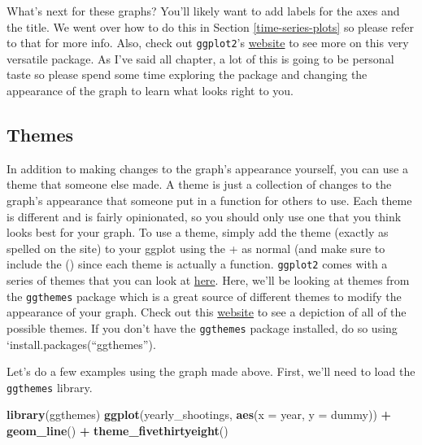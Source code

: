 \documentclass[
  12pt,
]{book}
\newenvironment{Shaded}{\begin{snugshade}}{\end{snugshade}}
\newcommand{\DataTypeTok}[1]{\textcolor[rgb]{0.27,0.27,0.27}{#1}}
\newcommand{\KeywordTok}[1]{\textcolor[rgb]{0.27,0.27,0.27}{\textbf{#1}}}
\newcommand{\NormalTok}[1]{#1}
\newcommand{\OperatorTok}[1]{\textcolor[rgb]{0.43,0.43,0.43}{\textbf{#1}}}
\newcommand{\StringTok}[1]{\textcolor[rgb]{0.5,0.5,0.5}{#1}}
\begin{document}
What's next for these graphs? You'll likely want to add labels for the axes and the title. We went over how to do this in Section \ref{time-series-plots} so please refer to that for more info. Also, check out \texttt{ggplot2}'s \href{https://ggplot2.tidyverse.org/reference/index.html\#section-scales}{website} to see more on this very versatile package. As I've said all chapter, a lot of this is going to be personal taste so please spend some time exploring the package and changing the appearance of the graph to learn what looks right to you.

\hypertarget{themes}{%
\subsection{Themes}\label{themes}}

In addition to making changes to the graph's appearance yourself, you can use a theme that someone else made. A theme is just a collection of changes to the graph's appearance that someone put in a function for others to use. Each theme is different and is fairly opinionated, so you should only use one that you think looks best for your graph. To use a theme, simply add the theme (exactly as spelled on the site) to your ggplot using the + as normal (and make sure to include the () since each theme is actually a function. \texttt{ggplot2} comes with a series of themes that you can look at \href{https://ggplot2.tidyverse.org/reference/ggtheme.html}{here}. Here, we'll be looking at themes from the \texttt{ggthemes} package which is a great source of different themes to modify the appearance of your graph. Check out this \href{https://yutannihilation.github.io/allYourFigureAreBelongToUs/ggthemes/}{website} to see a depiction of all of the possible themes. If you don't have the \texttt{ggthemes} package installed, do so using `install.packages(``ggthemes'').

Let's do a few examples using the graph made above. First, we'll need to load the \texttt{ggthemes} library.

\begin{Shaded}
\begin{Highlighting}[]
\KeywordTok{library}\NormalTok{(ggthemes)}
\KeywordTok{ggplot}\NormalTok{(yearly\_shootings, }\KeywordTok{aes}\NormalTok{(}\DataTypeTok{x =}\NormalTok{ year, }\DataTypeTok{y =}\NormalTok{ dummy)) }\OperatorTok{+}
\StringTok{  }\KeywordTok{geom\_line}\NormalTok{() }\OperatorTok{+}
\StringTok{  }\KeywordTok{theme\_fivethirtyeight}\NormalTok{()}
\end{Highlighting}
\end{Shaded}
\end{document}
